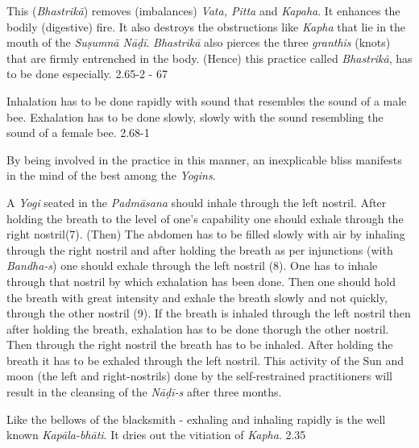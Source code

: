 
This (\textit{Bhastrikā}) removes (imbalances) \textit{Vata, Pitta} and \textit{Kapaha}. It enhances the bodily (digestive) fire. It also destroys the obstructions like \textit{Kapha} that lie in the mouth of the \textit{Suṣumnā Nāḍī}. \textit{Bhastrikā} also pierces the three \textit{granthis} (knots) that are firmly entrenched in the body. (Hence) this practice called \textit{Bhastrikā}, has to be done especially. 2.65-2 - 67


Inhalation has to be done rapidly with sound that resembles the sound of a male bee. Exhalation has to be done slowly, slowly with the sound resembling the sound of a female bee. 2.68-1


By being involved in the practice in this manner, an inexplicable bliss manifests in the mind of the best among the \textit{Yogins}.


\vspace{10pt}
A \textit{Yogi} seated in the \textit{Padmāsana} should inhale through the left nostril. After holding the breath to the level of one’s capability one should exhale through the right nostril(7). (Then) The abdomen has to be filled slowly with air by inhaling through the right nostril and after holding the breath as per injunctions (with \textit{Bandha-s}) one should exhale through the left nostril (8). One has to inhale through that nostril by which exhalation has been done. Then one should hold the breath with great intensity and exhale the breath slowly and not quickly, through the other nostril (9).  If the breath is inhaled through the left nostril then after holding the breath, exhalation has to be done thorugh the other nostril. Then through the right nostril the breath has to be inhaled. After holding the breath it has to be exhaled through the left nostril. This activity of the Sun and moon (the left and right-nostrils) done by the self-restrained practitioners will result in the cleansing of the \textit{Nāḍī-s} after three months. 


Like the bellows of the blacksmith - exhaling and inhaling rapidly is the well known \textit{Kapāla-bhāti}. It dries out the vitiation of \textit{Kapha}. 2.35
\newpage

